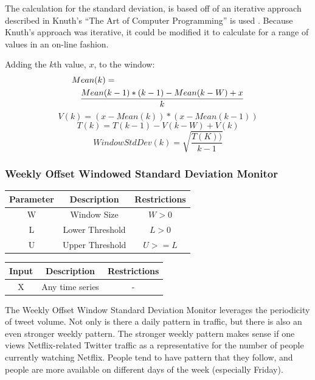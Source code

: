 \documentclass[12pt]{ucthesis}
\begin{document}
The calculation for the standard deviation, is based off of an iterative approach described in Knuth's ``The Art of Computer Programming'' is used \cite{Knuth}.
Because Knuth's approach was iterative, it could be modified it to calculate for a range of values in an on-line fashion.

Adding the $k$th value, $x$, to the window:
\begin{eqnarray*}
   \lefteqn{Mean(k) = }\\
   && \frac{Mean(k - 1) * (k - 1) - Mean(k - W) + x}{k}
\end{eqnarray*}
$$
   V(k) = (x - Mean(k)) * (x - Mean(k - 1))
$$
$$
   T(k) = T(k - 1) - V(k - W) + V(k)
$$
$$
   WindowStdDev(k) = \sqrt{\frac{T(K))}{k - 1}}
$$

\subsubsection{Weekly Offset Windowed Standard Deviation Monitor}
\label{outage-detection-monitors-WeeklyWindowStdDev}
\begin{table}[H]
   \begin{center}
      \begin{tabular}{|c|c|c|}
         \hline
            Parameter & Description & Restrictions \\
         \hline
            W & Window Size & $ W > 0 $\\
         \hline
            L & Lower Threshold & $L > 0 $\\
         \hline 
            U & Upper Threshold & $U >= L $\\
         \hline 
      \end{tabular}
   \end{center}
\end{table}

\begin{table}[H]
   \begin{center}
      \begin{tabular}{|c|c|c|}
         \hline
            Input & Description & Restrictions \\
         \hline
            X & Any time series & - \\
         \hline
      \end{tabular}
   \end{center}
\end{table}

The Weekly Offset Window Standard Deviation Monitor leverages the periodicity of tweet volume.
Not only is there a daily pattern in traffic, but there is also an even stronger weekly pattern.
The stronger weekly pattern makes sense if one views Netflix-related Twitter traffic as a representative for the number of
people currently watching Netflix. People tend to have pattern that they follow, and people are more available
on different days of the week (especially Friday).
\end{document}
